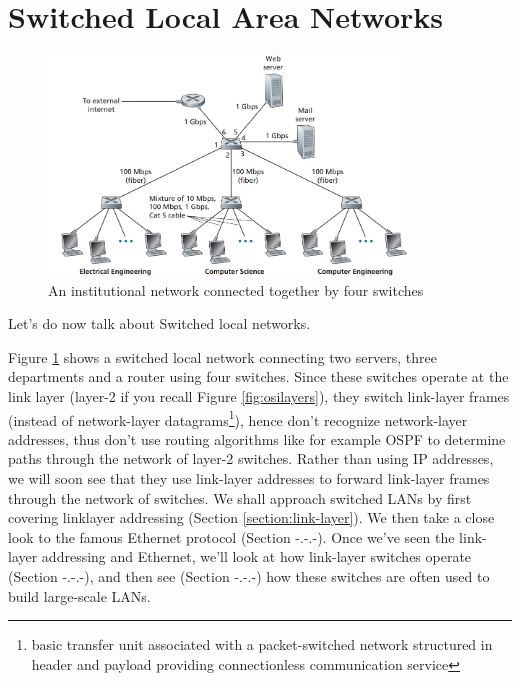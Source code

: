 \documentclass[a4paper,12pt]{book}
\begin{document}

\clearpage

\section{Switched Local Area Networks}

\begin{figure}
\centering
\includegraphics[width=9.5cm]{./switched-lan.PNG}
\caption{An institutional network connected together by four switches}\label{fig:switched-lan}
\end{figure}


Let's do now talk about Switched local networks.

Figure \ref{fig:switched-lan} shows a switched local network connecting two servers, three departments and a router using four switches. Since these switches operate at the link layer (layer-2 if you recall Figure \ref{fig:osilayers}), they switch link-layer frames (instead of network-layer datagrams\footnote{\label{datagram}basic transfer unit associated with a packet-switched network structured in header and payload providing connectionless communication service}), hence don’t recognize network-layer addresses, thus don’t use routing algorithms like for example OSPF to determine paths through the network of layer-2 switches. Rather than using IP addresses, we will soon see that they use link-layer addresses to forward link-layer frames through the network of switches. We shall approach switched LANs by first covering linklayer addressing (Section \ref{section:link-layer}). We then take a close look to the famous Ethernet protocol (Section -.-.-). Once we've seen the link-layer addressing and Ethernet, we’ll look at how link-layer switches operate (Section -.-.-), and then see (Section -.-.-) how these switches are often used to build large-scale LANs.
\end{document}
